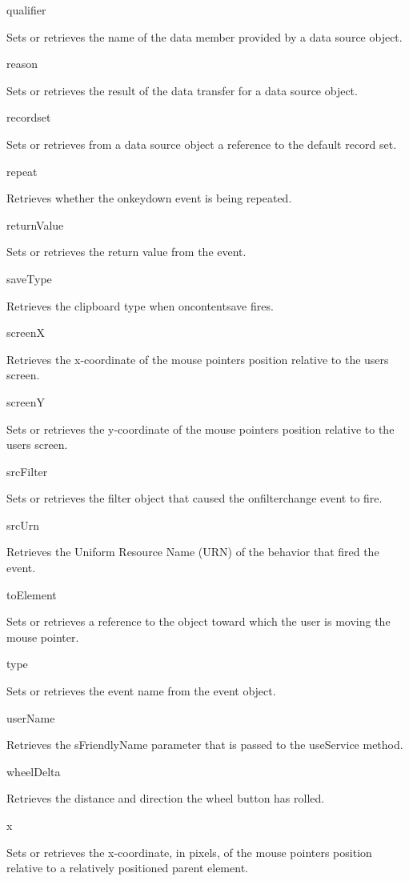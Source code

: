 \documentclass[
]{article}
\begin{document}
qualifier

Sets or retrieves the name of the data member provided by a data source
object.

reason

Sets or retrieves the result of the data transfer for a data source
object.

recordset

Sets or retrieves from a data source object a reference to the default
record set.

repeat

Retrieves whether the onkeydown event is being repeated.

returnValue

Sets or retrieves the return value from the event.

saveType

Retrieves the clipboard type when oncontentsave fires.

screenX

Retrieves the x-coordinate of the mouse pointer\textquotesingle s
position relative to the user\textquotesingle s screen.

screenY

Sets or retrieves the y-coordinate of the mouse
pointer\textquotesingle s position relative to the
user\textquotesingle s screen.

srcFilter

Sets or retrieves the filter object that caused the onfilterchange event
to fire.

srcUrn

Retrieves the Uniform Resource Name (URN) of the behavior that fired the
event.

toElement

Sets or retrieves a reference to the object toward which the user is
moving the mouse pointer.

type

Sets or retrieves the event name from the event object.

userName

Retrieves the sFriendlyName parameter that is passed to the useService
method.

wheelDelta

Retrieves the distance and direction the wheel button has rolled.

x

Sets or retrieves the x-coordinate, in pixels, of the mouse
pointer\textquotesingle s position relative to a relatively positioned
parent element.
\end{document}
